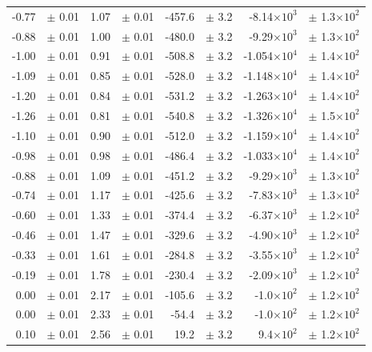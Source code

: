 \documentclass[a4paper]{article}
\begin{document}
\begin{center}
\begin{longtable}[htbp]{rlrlrlrl}
-0.77 & $\pm$ 0.01 & 1.07 & $\pm$ 0.01 & -457.6 & $\pm$ 3.2 & -8.14$\times 10^{3}$ & $\pm$ 1.3$\times 10^{2}$ \\ 
-0.88 & $\pm$ 0.01 & 1.00 & $\pm$ 0.01 & -480.0 & $\pm$ 3.2 & -9.29$\times 10^{3}$ & $\pm$ 1.3$\times 10^{2}$ \\ 
-1.00 & $\pm$ 0.01 & 0.91 & $\pm$ 0.01 & -508.8 & $\pm$ 3.2 & -1.054$\times 10^{4}$ & $\pm$ 1.4$\times 10^{2}$ \\ 
-1.09 & $\pm$ 0.01 & 0.85 & $\pm$ 0.01 & -528.0 & $\pm$ 3.2 & -1.148$\times 10^{4}$ & $\pm$ 1.4$\times 10^{2}$ \\ 
-1.20 & $\pm$ 0.01 & 0.84 & $\pm$ 0.01 & -531.2 & $\pm$ 3.2 & -1.263$\times 10^{4}$ & $\pm$ 1.4$\times 10^{2}$ \\ 
-1.26 & $\pm$ 0.01 & 0.81 & $\pm$ 0.01 & -540.8 & $\pm$ 3.2 & -1.326$\times 10^{4}$ & $\pm$ 1.5$\times 10^{2}$ \\ 
-1.10 & $\pm$ 0.01 & 0.90 & $\pm$ 0.01 & -512.0 & $\pm$ 3.2 & -1.159$\times 10^{4}$ & $\pm$ 1.4$\times 10^{2}$ \\ 
-0.98 & $\pm$ 0.01 & 0.98 & $\pm$ 0.01 & -486.4 & $\pm$ 3.2 & -1.033$\times 10^{4}$ & $\pm$ 1.4$\times 10^{2}$ \\ 
-0.88 & $\pm$ 0.01 & 1.09 & $\pm$ 0.01 & -451.2 & $\pm$ 3.2 & -9.29$\times 10^{3}$ & $\pm$ 1.3$\times 10^{2}$ \\ 
-0.74 & $\pm$ 0.01 & 1.17 & $\pm$ 0.01 & -425.6 & $\pm$ 3.2 & -7.83$\times 10^{3}$ & $\pm$ 1.3$\times 10^{2}$ \\ 
-0.60 & $\pm$ 0.01 & 1.33 & $\pm$ 0.01 & -374.4 & $\pm$ 3.2 & -6.37$\times 10^{3}$ & $\pm$ 1.2$\times 10^{2}$ \\ 
-0.46 & $\pm$ 0.01 & 1.47 & $\pm$ 0.01 & -329.6 & $\pm$ 3.2 & -4.90$\times 10^{3}$ & $\pm$ 1.2$\times 10^{2}$ \\ 
-0.33 & $\pm$ 0.01 & 1.61 & $\pm$ 0.01 & -284.8 & $\pm$ 3.2 & -3.55$\times 10^{3}$ & $\pm$ 1.2$\times 10^{2}$ \\ 
-0.19 & $\pm$ 0.01 & 1.78 & $\pm$ 0.01 & -230.4 & $\pm$ 3.2 & -2.09$\times 10^{3}$ & $\pm$ 1.2$\times 10^{2}$ \\ 
0.00 & $\pm$ 0.01 & 2.17 & $\pm$ 0.01 & -105.6 & $\pm$ 3.2 & -1.0$\times 10^{2}$ & $\pm$ 1.2$\times 10^{2}$ \\ 
0.00 & $\pm$ 0.01 & 2.33 & $\pm$ 0.01 & -54.4 & $\pm$ 3.2 & -1.0$\times 10^{2}$ & $\pm$ 1.2$\times 10^{2}$ \\ 
0.10 & $\pm$ 0.01 & 2.56 & $\pm$ 0.01 & 19.2 & $\pm$ 3.2 & 9.4$\times 10^{2}$ & $\pm$ 1.2$\times 10^{2}$ \\ 

\end{longtable}
\end{center}
\end{document}
